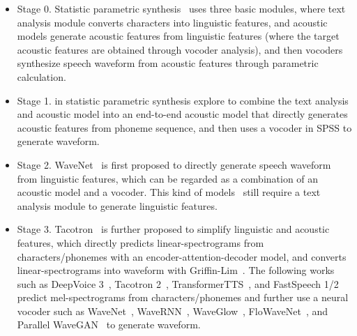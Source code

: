 \documentclass{article}
\begin{document}
\begin{itemize}[leftmargin=*]
    \item Stage 0. Statistic parametric synthesis~\cite{yoshimura1999simultaneous,tokuda2000speech,yoshimura2002simultaneous,zen2009statistical,tokuda2013speech} uses three basic modules, where text analysis module converts characters into linguistic features, and acoustic models generate acoustic features from linguistic features (where the target acoustic features are obtained through vocoder analysis), and then vocoders synthesize speech waveform from acoustic features through parametric calculation. 
    \item Stage 1. \citet{wang2016first} in statistic parametric synthesis explore to combine the text analysis and acoustic model into an end-to-end acoustic model that directly generates acoustic features from phoneme sequence, and then uses a vocoder in SPSS to generate waveform. 
    \item Stage 2. WaveNet~\cite{oord2016wavenet} is first proposed to directly generate speech waveform from linguistic features, which can be regarded as a combination of an acoustic model and a vocoder. This kind of models~\cite{oord2016wavenet,oord2018parallel,kalchbrenner2018efficient,binkowski2019high} still require a text analysis module to generate linguistic features. 
    \item Stage 3. Tacotron~\cite{wang2017tacotron} is further proposed to simplify linguistic and acoustic features, which directly predicts linear-spectrograms from characters/phonemes with an encoder-attention-decoder model, and converts linear-spectrograms into waveform with Griffin-Lim~\cite{griffin1984signal}. The following works such as DeepVoice 3~\cite{ping2018deep}, Tacotron 2~\cite{shen2018natural}, TransformerTTS~\cite{li2019neural}, and FastSpeech 1/2~\cite{ren2019fastspeech,ren2021fastspeech} predict mel-spectrograms from characters/phonemes and further use a neural vocoder such as WaveNet~\cite{oord2016wavenet}, WaveRNN~\cite{kalchbrenner2018efficient}, WaveGlow~\cite{prenger2019waveglow}, FloWaveNet~\cite{kim2019flowavenet}, and Parallel WaveGAN~\cite{yamamoto2020parallel} to generate waveform.

\end{itemize}
\end{document}
